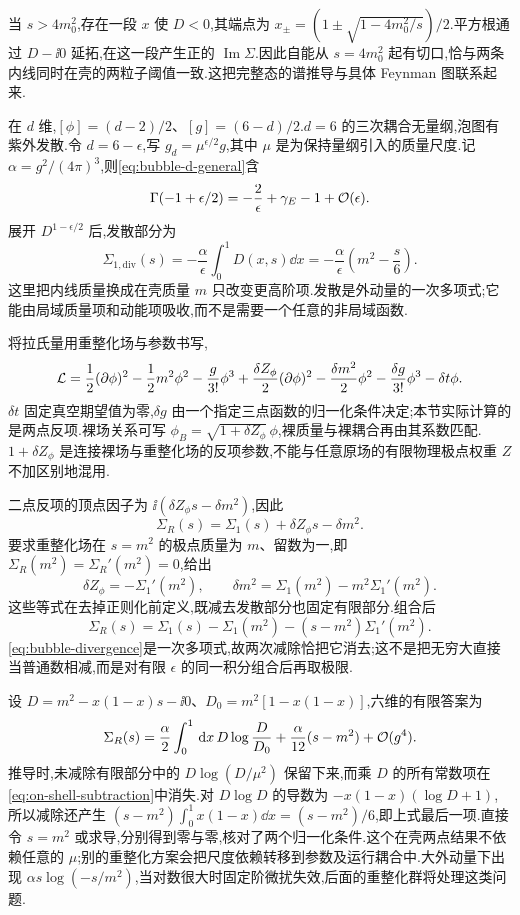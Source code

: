 当 $s>4m_0^2$,存在一段 $x$ 使 $D<0$,其端点为 $x_\pm=(1\pm\sqrt{1-4m_0^2/s})/2$.平方根通过 $D-\ii0$ 延拓,在这一段产生正的 $\operatorname{Im}\Sigma$.因此自能从 $s=4m_0^2$ 起有切口,恰与两条内线同时在壳的两粒子阈值一致.这把完整态的谱推导与具体 Feynman 图联系起来.

在 $d$ 维,$[\phi]=(d-2)/2$、$[g]=(6-d)/2$.$d=6$ 的三次耦合无量纲,泡图有紫外发散.令 $d=6-\epsilon$,写 $g_d=\mu^{\epsilon/2}g$,其中 $\mu$ 是为保持量纲引入的质量尺度.记 $\alpha=g^2/(4\pi)^3$,则\eqref{eq:bubble-d-general}含
\[
 \Gamma(-1+\epsilon/2)=-\frac2\epsilon+\gamma_E-1+\mathcal O(\epsilon).
\]
展开 $D^{1-\epsilon/2}$ 后,发散部分为
\begin{equation}\label{eq:bubble-divergence}
 \Sigma_{1,\mathrm{div}}(s)=-\frac\alpha\epsilon\int_0^1D(x,s)\dd x
 =-\frac\alpha\epsilon\left(m^2-\frac s6\right).
\end{equation}
这里把内线质量换成在壳质量 $m$ 只改变更高阶项.发散是外动量的一次多项式;它能由局域质量项和动能项吸收,而不是需要一个任意的非局域函数.

将拉氏量用重整化场与参数书写,
\[
 \mathcal L=\frac12(\partial\phi)^2-\frac12m^2\phi^2-\frac g{3!}\phi^3
 +\frac{\delta Z_\phi}{2}(\partial\phi)^2-\frac{\delta m^2}{2}\phi^2
 -\frac{\delta g}{3!}\phi^3-\delta t\phi.
\]
$\delta t$ 固定真空期望值为零,$\delta g$ 由一个指定三点函数的归一化条件决定;本节实际计算的是两点反项.裸场关系可写 $\phi_B=\sqrt{1+\delta Z_\phi}\,\phi$,裸质量与裸耦合再由其系数匹配.$1+\delta Z_\phi$ 是连接裸场与重整化场的反项参数,不能与任意原场的有限物理极点权重 $Z$ 不加区别地混用.

二点反项的顶点因子为 $\ii(\delta Z_\phi s-\delta m^2)$,因此
\[
 \Sigma_R(s)=\Sigma_1(s)+\delta Z_\phi s-\delta m^2.
\]
要求重整化场在 $s=m^2$ 的极点质量为 $m$、留数为一,即
$\Sigma_R(m^2)=\Sigma_R'(m^2)=0$,给出
\[
 \delta Z_\phi=-\Sigma_1'(m^2),\qquad
 \delta m^2=\Sigma_1(m^2)-m^2\Sigma_1'(m^2).
\]
这些等式在去掉正则化前定义,既减去发散部分也固定有限部分.组合后
\begin{equation}\label{eq:on-shell-subtraction}
 \Sigma_R(s)=\Sigma_1(s)-\Sigma_1(m^2)-(s-m^2)\Sigma_1'(m^2).
\end{equation}
\eqref{eq:bubble-divergence}是一次多项式,故两次减除恰把它消去;这不是把无穷大直接当普通数相减,而是对有限 $\epsilon$ 的同一积分组合后再取极限.

设 $D=m^2-x(1-x)s-\ii0$、$D_0=m^2[1-x(1-x)]$,六维的有限答案为
\begin{equation}\label{eq:renormalized-bubble-six}
 \Sigma_R(s)=\frac\alpha2\int_0^1\,\mathrm d x\,D\log\frac D{D_0}
 +\frac\alpha{12}(s-m^2)+\mathcal O(g^4).
\end{equation}
推导时,未减除有限部分中的 $D\log(D/\mu^2)$ 保留下来,而乘 $D$ 的所有常数项在\eqref{eq:on-shell-subtraction}中消失.对 $D\log D$ 的导数为 $-x(1-x)(\log D+1)$,所以减除还产生 $(s-m^2)\int_0^1x(1-x)\dd x=(s-m^2)/6$,即上式最后一项.直接令 $s=m^2$ 或求导,分别得到零与零,核对了两个归一化条件.这个在壳两点结果不依赖任意的 $\mu$;别的重整化方案会把尺度依赖转移到参数及运行耦合中.大外动量下出现 $\alpha s\log(-s/m^2)$,当对数很大时固定阶微扰失效,后面的重整化群将处理这类问题.

